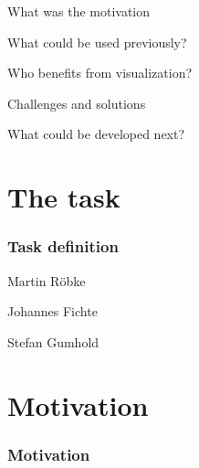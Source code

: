 \documentclass[c,8pt,xcolor...,x11names]{beamer}
\begin{document}
\begin{frame}
	\customtitle
	\begin{list2}
		\item {\sc What} was the motivation
		\item {\sc What} could be used previously?
		\item {\sc Who} benefits from visualization?
		\item {\sc Challenges} and solutions
		\item {\sc What} could be developed next?
	\end{list2}
\end{frame}

\section{The task} %

\begin{frame}
	\frametitle{Task definition}

	Martin R\"obke
	
	Johannes Fichte
	
	Stefan Gumhold

\end{frame}

\section{Motivation}

\begin{frame}
	\frametitle{Motivation}

\end{frame}

\end{document}
